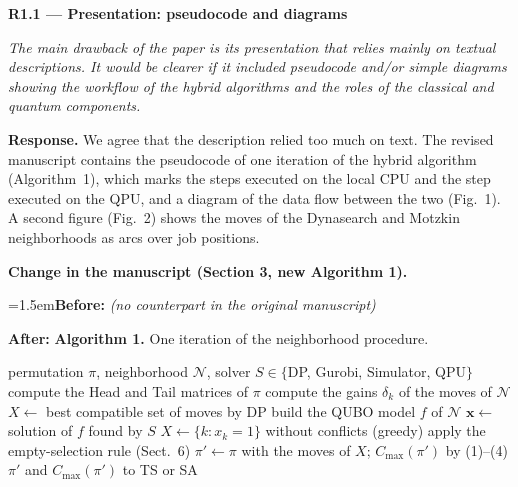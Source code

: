 \documentclass[12pt]{article}
\newenvironment{rc}[1]{\par\medskip\noindent\textbf{#1}\par\nopagebreak\noindent\itshape\renewcommand{\emph}[1]{\textbf{##1}}\ignorespaces}{\par}
\newcommand{\answer}[1]{\par\smallskip\noindent\textbf{Response.} #1\par}
\newcommand{\change}[3]{\par\smallskip\noindent\textbf{Change in the manuscript (#1).}\par
  {\leftskip=1.5em\noindent\textbf{Before:} #2\par\noindent\textbf{After:} #3\par}}
\begin{document}
\begin{rc}{R1.1 --- Presentation: pseudocode and diagrams}
The main drawback of the paper is its presentation that relies mainly on textual descriptions. It would be clearer if it included pseudocode and/or simple diagrams showing the workflow of the hybrid algorithms and the roles of the classical and quantum components.
\end{rc}
\answer{We agree that the description relied too much on text. The revised manuscript contains the pseudocode of one iteration of the hybrid algorithm (Algorithm~1), which marks the steps executed on the local CPU and the step executed on the QPU, and a diagram of the data flow between the two (Fig.~1). A second figure (Fig.~2) shows the moves of the Dynasearch and Motzkin neighborhoods as arcs over job positions.}
\change{Section 3, new Algorithm 1}{\textit{(no counterpart in the original manuscript)}}{\textbf{Algorithm 1.} One iteration of the neighborhood procedure.\par\begin{algorithmic}[1]
\Require permutation $\pi$, neighborhood $\mathcal{N}$, solver $S\in\{$DP, Gurobi, Simulator, QPU$\}$
\State compute the Head and Tail matrices of $\pi$ \Comment{CPU}
\State compute the gains $\delta_k$ of the moves of $\mathcal{N}$ \Comment{CPU}
\If{$S=$ DP}
  \State $X\gets$ best compatible set of moves by DP \Comment{CPU}
\Else
  \State build the QUBO model $f$ of $\mathcal{N}$ \Comment{CPU}
  \State $\mathbf{x}\gets$ solution of $f$ found by $S$ \Comment{CPU; QPU via Leap}
  \State $X\gets\{k : x_k=1\}$ without conflicts (greedy) \Comment{CPU}
\EndIf
\If{$X=\emptyset$} apply the empty-selection rule (Sect.~6) \EndIf
\State $\pi'\gets\pi$ with the moves of $X$; $C_{\max}(\pi')$ by (1)--(4) \Comment{CPU}
\State \Return $\pi'$ and $C_{\max}(\pi')$ to TS or SA
\end{algorithmic}}
\end{document}
